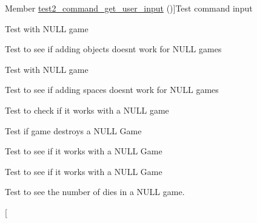 \begin{DoxyRefList}
\hypertarget{test__test000005}{}%
Member \hyperlink{command__test_8h_a3ba7658db8aa069706b344d42ceabfaa}{test2\+\_\+command\+\_\+get\+\_\+user\+\_\+input} ()]Test command input  
\item[\label{test__test000086}%
\hypertarget{test__test000086}{}%
Member \hyperlink{game__test_8h_af5c4dd79b2a7b67adbeeb8df5791a5de}{test2\+\_\+game\+\_\+add\+\_\+link} ()]Test with N\+U\+LL game  
\item[\label{test__test000048}%
\hypertarget{test__test000048}{}%
Member \hyperlink{game__test_8h_ab996895e69c5d41fab5515e88aed3975}{test2\+\_\+game\+\_\+add\+\_\+object} ()]Test to see if adding objects doesn\textquotesingle{}t work for N\+U\+LL games  
\item[\label{test__test000043}%
\hypertarget{test__test000043}{}%
Member \hyperlink{game__test_8h_a42bb53c500bf8ae4dce0e144a85cd80b}{test2\+\_\+game\+\_\+add\+\_\+player} ()]Test with N\+U\+LL game  
\item[\label{test__test000039}%
\hypertarget{test__test000039}{}%
Member \hyperlink{game__test_8h_aed0f40f3ab1c252e548b038542d7409d}{test2\+\_\+game\+\_\+add\+\_\+space} ()]Test to see if adding spaces doesn\textquotesingle{}t work for N\+U\+LL games  
\item[\label{test__test000029}%
\hypertarget{test__test000029}{}%
Member \hyperlink{game__test_8h_ad6ce67f6184f6ead2aaca860f64e9b76}{test2\+\_\+game\+\_\+create\+\_\+from\+\_\+file} ()]Test to check if it works with a N\+U\+LL game  
\item[\label{test__test000035}%
\hypertarget{test__test000035}{}%
Member \hyperlink{game__test_8h_a91a33a9fce738616f2140d06a6ff079f}{test2\+\_\+game\+\_\+destroy} ()]Test if game destroys a N\+U\+LL Game  
\item[\label{test__test000068}%
\hypertarget{test__test000068}{}%
Member \hyperlink{game__test_8h_a5894e9abe6b633d53b01ad8691655a26}{test2\+\_\+game\+\_\+find} ()]Test to see if it works with a N\+U\+LL Game  
\item[\label{test__test000071}%
\hypertarget{test__test000071}{}%
Member \hyperlink{game__test_8h_a4a26a36f14da83a296ff5057ddfd67a7}{test2\+\_\+game\+\_\+find\+\_\+name} ()]Test to see if it works with a N\+U\+LL Game  
\item[\label{test__test000066}%
\hypertarget{test__test000066}{}%
Member \hyperlink{game__test_8h_a3cf79c20d8101232319754300c699a22}{test2\+\_\+game\+\_\+get\+\_\+dies\+\_\+number} ()]Test to see the number of dies in a N\+U\+LL game.  
\item[\label{test__test000083}%

\end{DoxyRefList}
